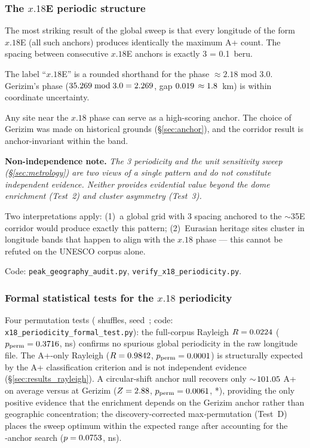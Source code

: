 \documentclass[HARVARD,twocolumn]{USG}
\begin{document}
\subsubsection*{The $x.18$\textdegree{}E periodic structure}
\label{sec:x18artifact}

The most striking result of the global sweep is that every longitude of
the form $x.18$\textdegree{}E (all \NharmonicsCoarse{} such anchors) produces identically
the maximum A+ count. The spacing between consecutive $x.18$\textdegree{}E
anchors is exactly 3\textdegree{} = 0.1~beru.

The label ``$x.18$\textdegree{}E'' is a rounded shorthand for the phase
$\approx 2.18$\textdegree{} mod 3.0\textdegree{}.
Gerizim's phase ($35.269 \bmod 3.0 = 2.269$\textdegree{},
gap $0.019$\textdegree{} $\approx 1.8$~km) is within
coordinate uncertainty.

Any site near the $x.18$\textdegree{} phase can serve as a high-scoring
anchor. The choice of Gerizim was made on historical grounds
(\S\ref{sec:anchor}), and the corridor result is anchor-invariant
within the band.

\textbf{Non-independence note.} \emph{The 3\textdegree{} periodicity and the unit
sensitivity sweep (\S\ref{sec:metrology}) are two views of a single
pattern and do not constitute independent evidence. Neither provides
evidential value beyond the dome enrichment (Test~2) and cluster asymmetry (Test~3).}

Two interpretations apply: (1)~a global grid with 3\textdegree{} spacing
anchored to the $\sim$35\textdegree{}E corridor would produce exactly this
pattern; (2)~Eurasian heritage sites cluster in longitude bands that happen
to align with the $x.18$\textdegree{} phase — this cannot be refuted on the
UNESCO corpus alone.

Code: \texttt{peak\_geography\_audit.py}, \texttt{verify\_x18\_periodicity.py}.

\subsubsection*{Formal statistical tests for the $x.18$\textdegree{} periodicity}
\label{sec:x18_formal}

Four permutation tests (\NpermRayleigh{} shuffles, seed~\simSeed{};
code: \texttt{x18\_periodicity\_formal\_test.py}):
the full-corpus Rayleigh $R = 0.0224$ ($p_\mathrm{perm} = 0.3716$, ns)
confirms no spurious global periodicity in the raw longitude file.
The A+-only Rayleigh ($R = 0.9842$, $p_\mathrm{perm} = 0.0001$)
is structurally expected by the A+ classification criterion and is not
independent evidence (\S\ref{sec:results_rayleigh}).
A circular-shift anchor null recovers only $\sim\!101.05$ A+ on average
versus \anchorShiftApCount{} at Gerizim ($Z = 2.88$,
$p_\mathrm{perm} = 0.0061$, *), providing the only positive evidence that 
the enrichment depends on the Gerizim anchor rather than geographic concentration; 
the discovery-corrected max‑permutation (Test~D) places the sweep 
optimum within the expected range after accounting for 
the \anchorSweepNanchors{}‑anchor search ($p = 0.0753$, ns).
\end{document}
